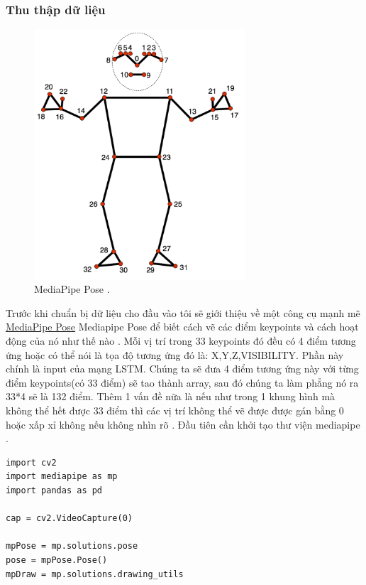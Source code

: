 \subsubsection{Thu thập dữ liệu }

    \begin{figure}[h!]
	\centering
	\includegraphics[width=0.7\textwidth]{Figures/pose_landmarks_index.png}
	\caption[MediaPipe Pose .]{MediaPipe Pose .}
	\label{pose_landmarks_index.png} 
    \end{figure}
Trước khi chuẩn bị dữ liệu cho đầu vào tôi sẽ giới thiệu về một công cụ mạnh mẽ \href{https://developers.google.com/mediapipe/solutions/vision/pose_landmarker/}{MediaPipe Pose} Mediapipe Pose để biết cách vẽ các điểm keypoints và cách hoạt động của nó như thế nào . Mỗi vị trí trong 33 keypoints đó đều có 4 điểm tương ứng hoặc có thể nói là tọa độ tương ứng đó là: X,Y,Z,VISIBILITY. Phần này chính là input của mạng LSTM. Chúng ta sẽ đưa 4 điểm tương ứng này với từng điểm keypoints(có 33 điểm) sẽ tao thành array, sau đó chúng ta làm phẳng nó ra 33*4 sẽ là 132 điểm. Thêm 1 vấn đề nữa là nếu như trong 1 khung hình mà không thể hết được 33 điểm thì các vị trí không thể vẽ được được gán bằng 0 hoặc xấp xỉ không nếu không nhìn rõ . 
Đầu tiên cần khởi tạo thư viện mediapipe . 

\begin{lstlisting}[style=codePython]
 	import cv2
import mediapipe as mp
import pandas as pd

cap = cv2.VideoCapture(0)

mpPose = mp.solutions.pose
pose = mpPose.Pose()
mpDraw = mp.solutions.drawing_utils
\end{lstlisting}

